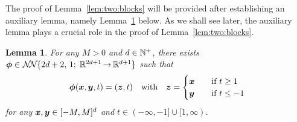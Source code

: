 \documentclass[nohyperref]{article}
\theoremstyle{plain}
\newtheorem{lemma}[theorem]{Lemma}
\theoremstyle{definition}
\theoremstyle{remark}
\begin{document}
The proof of Lemma~\ref{lem:two:blocks} will be provided after establishing an auxiliary lemma, namely Lemma~\ref{lem:binary:selector} below. As we shall see later, the auxiliary lemma plays a crucial role in the proof of Lemma~\ref{lem:two:blocks}.

\begin{lemma}
	\label{lem:binary:selector}
	For any $M>0$ and $d\in \N^+$, there exists $\bmphi\in \nn{2d+2}{1}{2d+1}{d+1}$
	such that
	\begin{equation*}
		{\bm{\phi}}({\bm{x}},{\bm{y}},t)=({\bm{z}},t) \quad \textnormal{with} \quad
		{\bm{z}}=\begin{cases}
			{\bm{x}} \quad & \textnormal{if}\  t\ge 1   \\
			{\bm{y}} \quad  & \textnormal{if}\  t\le -1
		\end{cases}
	\end{equation*}
	for any ${\bm{x}},{\bm{y}} \in [-M,M]^d$ and $t\in (-\infty,-1]\cup[1,\infty)$.
\end{lemma}
\end{document}
